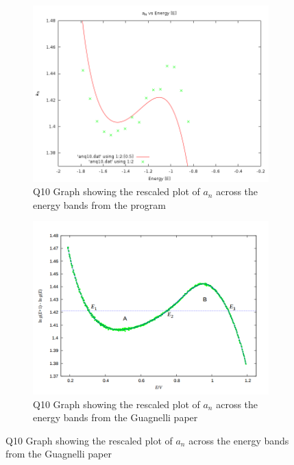 \begin{figure}[H]
\centering
\begin{subfigure}[b]{0.45\textwidth}
    \includegraphics[width=\textwidth]{4-Results/Q10-MyData.png}
    \caption{Q10 Graph showing the rescaled plot of $a_n$ across the energy bands from the program}
\end{subfigure}
\begin{subfigure}[b]{0.45\textwidth}
    \includegraphics[width=\textwidth]{4-Results/Q10-ComparisonGuagnelli.png}
    \caption{Q10 Graph showing the rescaled plot of $a_n$ across the energy bands from the Guagnelli paper\cite{Montroll1963}}
\end{subfigure}
\end{figure}

